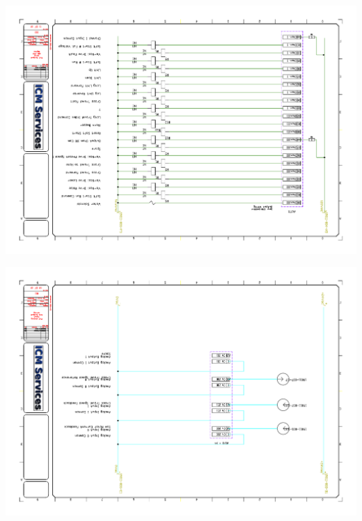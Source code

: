 \begin{center}
	\includegraphics[width=7.5in,angle=90]{../DRAWINGS/19011-010.pdf}
	\label{schem:010} %
\end{center}
\begin{center}
	\includegraphics[width=7.5in,angle=90]{../DRAWINGS/19011-011.pdf}
	\label{schem:011} %
\end{center}